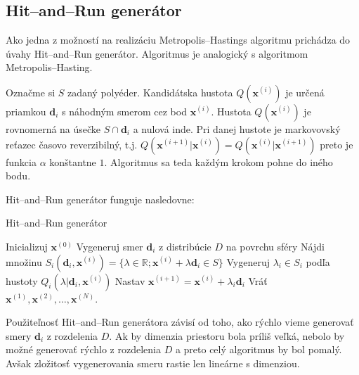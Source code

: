 \subsection{Hit--and--Run generátor}

Ako jedna z možností na realizáciu Metropolis--Hastings algoritmu prichádza do úvahy Hit--and--Run generátor. Algoritmus je analogický s algoritmom Metropolis--Hasting.

Označme si $S$ zadaný polyéder. Kandidátska hustota $Q(\mathbf x^{(i)})$ je určená priamkou $\mathbf d_i$ s náhodným smerom cez bod $\mathbf x^{(i)}$. Hustota $Q(\mathbf x^{(i)})$ je rovnomerná na úsečke $S \cap \mathbf d_i$ a nulová inde. Pri danej hustote je markovovský reťazec časovo reverzibilný, t.j. $Q(\mathbf x^{(i+1)}|\mathbf x^{(i)})=Q(\mathbf x^{(i)}|\mathbf x^{(i+1)})$ \cite{hit-and-run_chen} preto je funkcia $\alpha$ konštantne $1$. Algoritmus sa teda každým krokom pohne do iného bodu.

Hit--and--Run generátor funguje nasledovne:

\begin{algorithm}[H]
	\caption{Hit--and--Run generátor \cite{hit-and-run_chen}}
	\label{hit--and--run}
	\begin{algorithmic}[1]
		\State Inicializuj $\mathbf x^{(0)}$
			\State Vygeneruj smer $\mathbf d_i$ z distribúcie $D$ na povrchu sféry
			\State Nájdi množinu $S_i(\mathbf d_i,\mathbf x^{(i)})=\{\lambda \in \mathbb{R}; \mathbf x^{(i)} + \lambda \mathbf d_i \in S \} $
			\State Vygeneruj $\lambda_i \in S_i$ podľa hustoty $Q_i(\lambda | \mathbf d_i, \mathbf x^{(i)})$
			\State Nastav $\mathbf x^{(i+1)}=\mathbf x^{(i)}+\lambda_i \mathbf d_i$
		\EndFor
		\State Vráť $\mathbf x^{(1)},\mathbf x^{(2)},\dots,\mathbf x^{(N)}$.
	\end{algorithmic}
\end{algorithm}

Použiteľnosť Hit--and--Run generátora závisí od toho, ako rýchlo vieme generovať smery $\mathbf d_i$ z rozdelenia $D$. Ak by dimenzia priestoru bola príliš veľká, nebolo by možné generovať rýchlo z rozdelenia $D$ a preto celý algoritmus by bol pomalý. Avšak zložitosť vygenerovania smeru rastie len lineárne s dimenziou.


